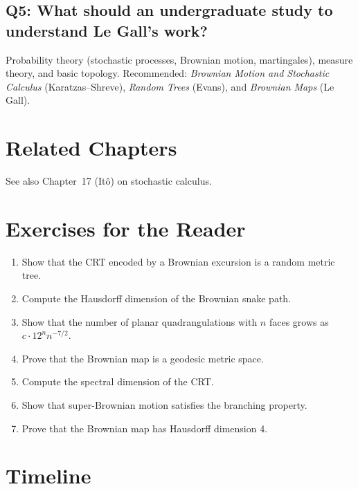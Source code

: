 \subsection*{Q5: What should an undergraduate study to understand Le Gall's work?}
Probability theory (stochastic processes, Brownian motion, martingales), measure theory, and basic topology. Recommended: \textit{Brownian Motion and Stochastic Calculus} (Karatzas--Shreve), \textit{Random Trees} (Evans), and \textit{Brownian Maps} (Le Gall).

\section{Related Chapters}
See also Chapter~17 (It\^o) on stochastic calculus.

\section*{Exercises for the Reader}

\begin{enumerate}
    \item [I] Show that the CRT encoded by a Brownian excursion is a random metric tree.
    \item [A] Compute the Hausdorff dimension of the Brownian snake path.
    \item [I] Show that the number of planar quadrangulations with $n$ faces grows as $c \cdot 12^n n^{-7/2}$.
    \item [A] Prove that the Brownian map is a geodesic metric space.
    \item [A] Compute the spectral dimension of the CRT.
    \item [I] Show that super-Brownian motion satisfies the branching property.
    \item [A] Prove that the Brownian map has Hausdorff dimension 4.
\end{enumerate}

\section*{Timeline}

